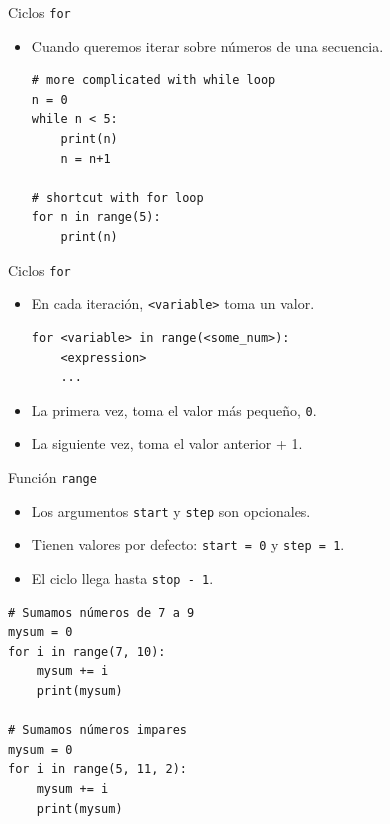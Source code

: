 \documentclass[mathserif]{beamer}
\begin{document}
\begin{frame}[fragile]{Ciclos \lstinline|for|}
    \begin{itemize}
        \item Cuando queremos iterar sobre números de una secuencia.
        
\begin{lstlisting}
# more complicated with while loop
n = 0
while n < 5:
    print(n)
    n = n+1

# shortcut with for loop
for n in range(5):
    print(n)
\end{lstlisting}
    \end{itemize}
\end{frame}

\begin{frame}[fragile]{Ciclos \lstinline|for|}
    \begin{itemize}
        \item En cada iteración, \lstinline|<variable>| toma un valor.
\begin{lstlisting}
for <variable> in range(<some_num>):
    <expression>
    ...
\end{lstlisting}
        
        \item La primera vez, toma el valor más pequeño, \lstinline|0|. 
        \item La siguiente vez, toma el valor anterior + 1.

    \end{itemize}
\end{frame}

\begin{frame}[fragile]{Función \lstinline|range|}
    \begin{itemize}
        \item Los argumentos \lstinline|start| y \lstinline|step| son opcionales.
        \item Tienen valores por defecto: \lstinline|start = 0| y \lstinline|step = 1|.
        
        \item El ciclo llega hasta \lstinline|stop - 1|.
    \end{itemize}
\begin{lstlisting}
# Sumamos números de 7 a 9
mysum = 0
for i in range(7, 10):
    mysum += i
    print(mysum)

# Sumamos números impares
mysum = 0
for i in range(5, 11, 2):
    mysum += i
    print(mysum)
\end{lstlisting}
    
\end{frame}
\end{document}
